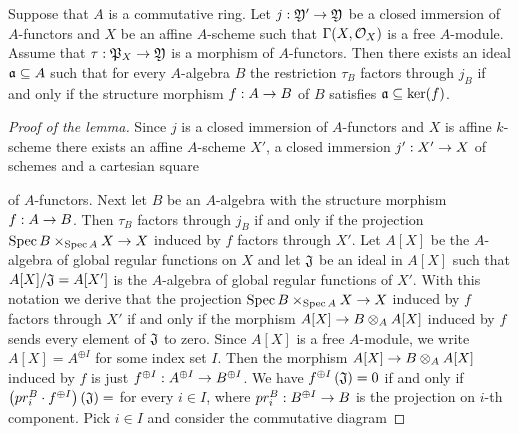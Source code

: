 \begin{lemma}\label{lemma:foraffinelocalfactorization}
Suppose that $A$ is a commutative ring. Let $j:{\mathfrak Y}'\rightarrow {\mathfrak Y}$ be a closed immersion of $A$-functors and $X$ be an affine $A$-scheme such that $\Gamma(X,{\mathcal O}_X)$ is a free $A$-module. Assume that $\tau:{\mathfrak P}_X\rightarrow {\mathfrak Y}$ is a morphism of $A$-functors. Then there exists an ideal $\mathfrak{a}\subseteq A$ such that for every $A$-algebra $B$ the restriction $\tau_B$ factors through $j_B$ if and only if the structure morphism $f:A\rightarrow B$ of $B$ satisfies $\mathfrak{a}\subseteq \ker(f)$.
\end{lemma}
\begin{proof}[Proof of the lemma]
Since $j$ is a closed immersion of $A$-functors and $X$ is affine $k$-scheme there exists an affine $A$-scheme $X'$, a closed immersion $j':X'\rightarrow X$ of schemes and a cartesian square
\begin{center}
\end{center}
of $A$-functors. Next let $B$ be an $A$-algebra with the structure morphism $f:A\rightarrow B$. Then $\tau_B$ factors through $j_B$ if and only if the projection $\mathrm{Spec}\, B\times_{\mathrm{Spec}\, A}X\rightarrow X$ induced by $f$ factors through $X'$. Let $A[X]$ be the $A$-algebra of global regular functions on $X$ and let $\mathfrak{J}$ be an ideal in $A[X]$ such that $A[X]/\mathfrak{J} = A[X']$ is the $A$-algebra of global regular functions of $X'$. With this notation we derive that the projection $\mathrm{Spec}\, B\times_{\mathrm{Spec}\, A}X\rightarrow X$ induced by $f$ factors through $X'$ if and only if the morphism $A[X]\rightarrow B\otimes_AA[X]$ induced by $f$ sends every element of $\mathfrak{J}$ to zero. Since $A[X]$ is a free $A$-module, we write $A[X] = A^{\oplus I}$ for some index set $I$. Then the morphism $A[X]\rightarrow B\otimes_AA[X]$ induced by $f$ is just $f^{\oplus I}:A^{\oplus I}\rightarrow B^{\oplus I}$. We have $f^{\oplus I}\left(\mathfrak{J}\right)=0$ if and only if $\left(pr^B_i\cdot f^{\oplus I}\right)\left(\mathfrak{J}\right)=$ for every $i\in I$, where $pr^B_i:B^{\oplus I}\rightarrow B$ is the projection on $i$-th component. Pick $i\in I$ and consider the commutative diagram

\end{proof}
